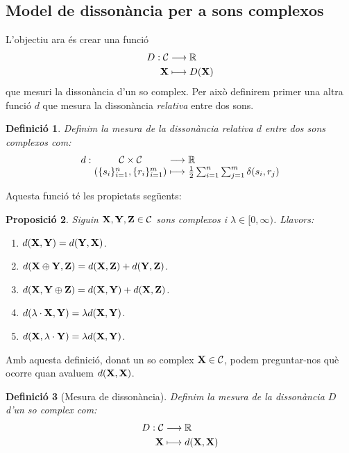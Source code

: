 \documentclass{article}
\theoremstyle{math}
\newtheorem{definition}{Definició}[section]
\newtheorem{prop}[definition]{Proposició}
\theoremstyle{TheoremNum}
\newcommand{\0}{\ensuremath{\vb{0}}}
\newcommand{\X}{\ensuremath{\vb{X}}}
\newcommand{\Y}{\ensuremath{\vb{Y}}}
\newcommand{\Z}{\ensuremath{\vb{Z}}}
\newcommand{\RR}{\ensuremath{\mathbb{R}}} %
\begin{document}
\subsection{Model de dissonància per a sons complexos}
\noindent L'objectiu ara és crear una funció
\begin{align*}
  D:\mathcal{C} & \longrightarrow\RR \\
  \X            & \longmapsto D(\X)
\end{align*}
que mesuri la dissonància d'un so complex. Per això definirem primer una altra funció $d$ que mesura la dissonància \textit{relativa} entre dos sons.
\begin{definition}
  Definim la \textit{mesura de la dissonància relativa $d$} entre dos sons complexos com:
  \begin{equation*}
    \begin{array}{r@{\hspace{0.5\tabcolsep}}c@{\hspace{0.5\tabcolsep}}c@{\hspace{0.5\tabcolsep}}l}
      d: & \mathcal{C}\times\mathcal{C}      & \longrightarrow & \RR                                                \\
         & (\{s_i\}_{i=1}^n,\{r_i\}_{i=1}^m) & \longmapsto     & \frac{1}{2}\sum_{i=1}^n\sum_{j=1}^m\delta(s_i,r_j)
    \end{array}
  \end{equation*}
\end{definition}
\noindent Aquesta funció té les propietats següents:
\begin{prop}\label{prop_dem1}
  Siguin $\X,\Y,\Z\in\mathcal{C}$ sons complexos i $\lambda\in[0,\infty)$. Llavors:
  \begin{enumerate}[label=$d$\arabic*),ref=$d$\arabic*]
    \item\label{d1} $d(\X,\Y)=d(\Y,\X)$.
    \item\label{d2} $d(\X\oplus\Y,\Z)=d(\X,\Z)+d(\Y,\Z)$.
    \item\label{d3} $d(\X,\Y\oplus\Z)=d(\X,\Y)+d(\X,\Z)$.
    \item\label{d4} $d(\lambda\cdot\X,\Y)=\lambda d(\X,\Y)$.
    \item\label{d5} $d(\X,\lambda\cdot\Y)=\lambda d(\X,\Y)$.
  \end{enumerate}
\end{prop}
\noindent Amb aquesta definició, donat un so complex $\X\in\mathcal{C}$, podem preguntar-nos què ocorre quan avaluem $d(\X,\X)$.
\begin{definition}[Mesura de dissonància]
  Definim la \textit{mesura de la dissonància $D$ d'un so complex} com:
  \begin{align*}
    D:\mathcal{C} & \longrightarrow\RR   \\
    \X            & \longmapsto d(\X,\X)
  \end{align*}
\end{definition}
\end{document}
